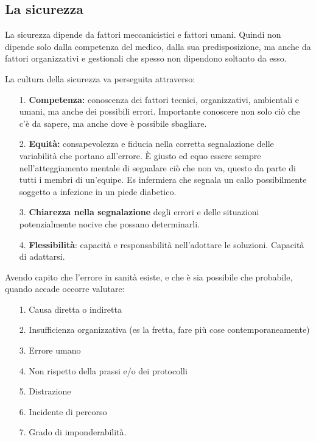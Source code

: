 \subsection{La sicurezza}

La sicurezza dipende da fattori meccanicistici e fattori umani. Quindi
non dipende solo dalla competenza del medico, dalla sua predisposizione,
ma anche da fattori organizzativi e gestionali che spesso non dipendono
soltanto da esso.

La cultura della sicurezza va perseguita attraverso:

\begin{itemize}
\item[1.]
  \textbf{Competenza:} conoscenza dei fattori tecnici, organizzativi,
  ambientali e umani, ma anche dei possibili errori. Importante
  conoscere non solo ciò che c'è da sapere, ma anche dove è possibile
  sbagliare.
\item[2.]
  \textbf{Equità:} consapevolezza e fiducia nella corretta segnalazione
  delle variabilità che portano all'errore. È giusto ed equo essere
  sempre nell'atteggiamento mentale di segnalare ciò che non va, questo
  da parte di tutti i membri di un'equipe. Es infermiera che segnala un
  callo possibilmente soggetto a infezione in un piede diabetico.
\item[3.]
  \textbf{Chiarezza nella segnalazione} degli errori e delle situazioni
  potenzialmente nocive che possano determinarli.
\item[4.]
  \textbf{Flessibilità}: capacità e responsabilità nell'adottare le
  soluzioni. Capacità di adattarsi.
\end{itemize}

Avendo capito che l'errore in sanità esiste, e che è sia possibile che
probabile, quando accade occorre valutare:

\begin{itemize}
\item[1.]
  Causa diretta o indiretta
\item[2.]
  Insufficienza organizzativa (es la fretta, fare più cose
  contemporaneamente)
\item[3.]
  Errore umano
\item[4.]
  Non rispetto della prassi e/o dei protocolli
\item[5.]
  Distrazione
\item[6.]
  Incidente di percorso
\item[7.]
  Grado di imponderabilità.
\end{itemize}

